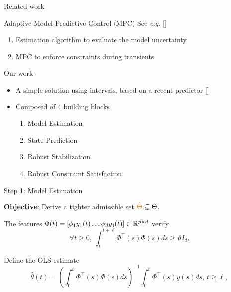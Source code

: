 \documentclass[slideopt,A4,showboxes,svgnames]{beamer}
\begin{document}
\begin{frame}{Related work}

\begin{alertblock}{Adaptive Model Predictive Control (MPC)}
	See \textit{e.g.} [\cite{Fukushima2007,Adetola2009,Adetola2011,Aswani2013,Vicente2019}]
	\pause
	\begin{enumerate}[<+->]
		\item Estimation algorithm to evaluate the model uncertainty
		\item MPC to enforce constraints during transients
	\end{enumerate}
\end{alertblock}
\pause[\thebeamerpauses]
\begin{exampleblock}{Our work}
	\begin{itemize}[<+->]
		\item A simple solution using \alert{intervals}, based on a \alert{recent predictor} [\cite{leurent2019interval}]
		\item Composed of 4 building blocks \begin{enumerate}
			\item Model Estimation
			\item State Prediction
			\item Robust Stabilization
			\item Robust Constraint Satisfaction
		\end{enumerate}
	\end{itemize}
\end{exampleblock}
\end{frame}

\begin{frame}{Step 1: Model Estimation}

\textbf{Objective}: Derive a tighter admissible set ${\color{orange} \hat{\Theta}} \subsetneq \Theta$.

\pause
\begin{assumption}
	\label{assu:PE}
	The features $\Phi(t)=[\phi_{1}y_{1}(t)\dots\phi_{d}y_{1}(t)]\in\mathbb{R}^{p\times d}$ verify
	\[\forall t\geq 0,\;
	\int_{t}^{t+\ell}\Phi^{\top}(s)\Phi(s)ds\ge\vartheta I_{d}.
	\]
\end{assumption}
\pause
Define the OLS estimate\begin{equation*}
\hat{\theta}(t)=
\left(\int_{0}^{t}\Phi^{\top}(s)\Phi(s)ds\right)^{-1}\int_{0}^{t}\Phi^{\top}(s)y(s)ds,\, t\geq\ell,
\end{equation*}
\end{frame}
\end{document}
